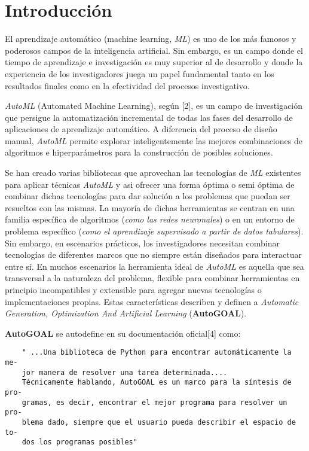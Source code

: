 \chapter*{Introducción}\label{chapter:introduction}

El aprendizaje automático (machine learning, {\it ML}) es uno de los más famosos
y poderosos campos de la inteligencia artificial. Sin embargo, es un campo
donde el tiempo de aprendizaje e investigación es muy superior al de desarrollo
y donde la experiencia de los investigadores juega un papel fundamental tanto
en los resultados finales como en la efectividad del procesos investigativo.

    {\it AutoML} (Automated Machine Learning), según [2], es un campo de investigación
que persigue la automatización incremental de todas las fases del desarrollo
de aplicaciones de aprendizaje automático. A diferencia del proceso de diseño
manual, {\it AutoML} permite explorar inteligentemente las mejores combinaciones
de algoritmos e hiperparámetros para la construcción de posibles soluciones.

Se han creado varias bibliotecas que aprovechan las tecnologías de {\it ML}
existentes para aplicar técnicas {\it AutoML} y asi ofrecer una forma óptima
o semi óptima de combinar dichas tecnologías para dar solución a
los problemas que puedan ser resueltos con las mismas. La mayoría de dichas
herramientas se centran en una familia específica de algoritmos ({\it como las
        redes neuronales}) o en un entorno de problema específico ({\it como el
        aprendizaje supervisado a partir de datos tabulares}). Sin embargo, en
escenarios prácticos, los investigadores necesitan combinar tecnologías de
diferentes marcos que no siempre están diseñados para interactuar entre sí.
En muchos escenarios la herramienta ideal de {\it AutoML} es aquella que sea
transversal a la naturaleza del problema, flexible para combinar herramientas
en principio incompatibles y extensible para agregar nuevas tecnologías o
implementaciones propias. Estas características describen y definen a
    {\it Automatic Generation, Optimization And Artificial Learning} ({\bf AutoGOAL}).

    {\bf AutoGOAL} se autodefine en su documentación oficial[4] como:

\begin{verbatim}
    " ...Una biblioteca de Python para encontrar automáticamente la me-
    jor manera de resolver una tarea determinada.... 
    Técnicamente hablando, AutoGOAL es un marco para la síntesis de pro-
    gramas, es decir, encontrar el mejor programa para resolver un pro-
    blema dado, siempre que el usuario pueda describir el espacio de to-
    dos los programas posibles"
\end{verbatim}


